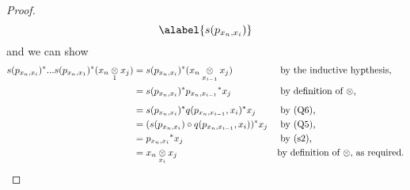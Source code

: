 \begin{proof}
$${\alabel{s(p_{x_n,x_i})}
}
$$
and we can show
\begin{align*}
s(p_{x_{n},x_{i}})^*...s(p_{x_{n},x_1})^*(\crossx{x_{n}}{x_j}{1})
& = s(p_{x_{n},x_{i}})^* (\crossx{x_{n}}{x_j}{x_{i-1}})
                                                   &&\mbox{ by the inductive hypthesis,} \\
&= s(p_{x_{n},x_{i}})^* {p_{x_n,x_{i-1}}} ^* x_j
                                                &&\mbox{ by definition of $\crossx{}{}{}$,}\\
&= s(p_{x_{n},x_{i}})^*  q(p_{x_n,x_{i-1}},x_i) ^* x_j
                                                &&\mbox{ by (Q6),}\\
&= (s(p_{x_{n},x_{i}}) \circ q(p_{x_n,x_{i-1}},x_i)) ^* x_j
                                                &&\mbox{ by (Q5),}\\
&= {p_{x_{n},x_{i}}}^*x_j
                                                &&\mbox{ by (s2),} \\
&= \crossx{x_{n}}{x_j}{x_{i}}
                                                &&\mbox{by definition of $\crossx{}{}{}$, as required.}
\end{align*}
\end{proof}